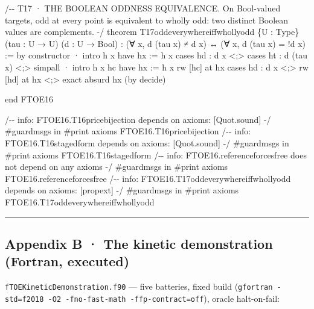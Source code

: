 \documentclass[10pt]{article}
\renewcommand{\_}{\origunderscore\allowbreak}
\newenvironment{Shaded}{}{}
\newcommand{\NormalTok}[1]{#1}
\begin{document}
\begin{Shaded}
\begin{Highlighting}[]
\NormalTok{/{-}{-} T17 · THE BOOLEAN ODDNESS EQUIVALENCE. On Bool{-}valued targets, odd at every}
\NormalTok{    point is equivalent to wholly odd: two distinct Boolean values are complements. {-}/}
\NormalTok{theorem T17\_odd\_everywhere\_iff\_wholly\_odd \{U : Type\} (tau : U → U) (d : U → Bool) :}
\NormalTok{    (∀ x, d (tau x) ≠ d x) ↔ (∀ x, d (tau x) = !d x) := by}
\NormalTok{  constructor}
\NormalTok{  · intro h x}
\NormalTok{    have hx := h x}
\NormalTok{    cases hd : d x \textless{};\textgreater{} cases ht : d (tau x) \textless{};\textgreater{} simp\_all}
\NormalTok{  · intro h x hc}
\NormalTok{    have hx := h x}
\NormalTok{    rw [hc] at hx}
\NormalTok{    cases hd : d x \textless{};\textgreater{} rw [hd] at hx \textless{};\textgreater{} exact absurd hx (by decide)}

\NormalTok{end FTOE16}

\NormalTok{/{-}{-} info: \textquotesingle{}FTOE16.T16\_price\_bijection\textquotesingle{} depends on axioms: [Quot.sound] {-}/}
\NormalTok{\#guard\_msgs in \#print axioms FTOE16.T16\_price\_bijection}
\NormalTok{/{-}{-} info: \textquotesingle{}FTOE16.T16\_staged\_form\textquotesingle{} depends on axioms: [Quot.sound] {-}/}
\NormalTok{\#guard\_msgs in \#print axioms FTOE16.T16\_staged\_form}
\NormalTok{/{-}{-} info: \textquotesingle{}FTOE16.reference\_forces\_free\textquotesingle{} does not depend on any axioms {-}/}
\NormalTok{\#guard\_msgs in \#print axioms FTOE16.reference\_forces\_free}
\NormalTok{/{-}{-} info: \textquotesingle{}FTOE16.T17\_odd\_everywhere\_iff\_wholly\_odd\textquotesingle{} depends on axioms: [propext] {-}/}
\NormalTok{\#guard\_msgs in \#print axioms FTOE16.T17\_odd\_everywhere\_iff\_wholly\_odd}
\end{Highlighting}
\end{Shaded}

\begin{center}\rule{0.5\linewidth}{0.5pt}\end{center}

\hypertarget{appendix-b-the-kinetic-demonstration-fortran-executed}{%
\subsection{Appendix B · The kinetic demonstration (Fortran,
executed)}\label{appendix-b-the-kinetic-demonstration-fortran-executed}}

\texttt{fTOE\_Kinetic\_Demonstration.f90} --- five batteries, fixed
build
(\texttt{gfortran\ -std=f2018\ -O2\ -fno-fast-math\ -ffp-contract=off}),
oracle halt-on-fail:
\end{document}
